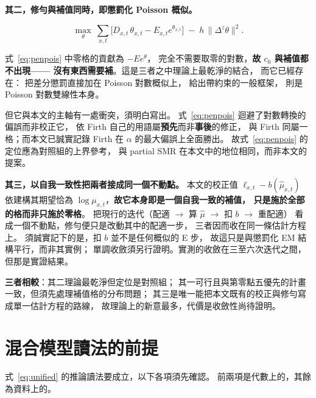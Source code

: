 \documentclass[UTF8, fontset=macnew, a4paper, 12pt]{ctexart}
\begin{document}
\textbf{其二，修勻與補值同時，即懲罰化 Poisson 概似。}

\begin{equation}\label{eq:penpois}
\max_{\theta}\ \sum_{x,t}\big[D_{x,t}\,\theta_{x,t}-E_{x,t}e^{\theta_{x,t}}\big]
\;-\;h\,\|\Delta^{z}\theta\|^2 .
\end{equation}

式~\eqref{eq:penpois} 中零格的貢獻為 $-E e^{\theta}$，
完全不需要取零的對數，\textbf{故 $c_0$ 與補值都不出現——
沒有東西需要補}。這是三者之中理論上最乾淨的結合，
而它已經存在：\citet{delwarde2007} 把差分懲罰直接加在 Poisson 對數概似上，
\citet{currie2013} 給出帶約束的一般框架，\citet{brouhns2002} 則是
Poisson 對數雙線性本身。

但它與本文的主軸有一處衝突，須明白寫出。
式~\eqref{eq:penpois} 迴避了對數轉換的偏誤而非校正它，
依 Firth 自己的用語屬\textbf{預先}而非\textbf{事後}的修正，
與 Firth 同屬一格；而本文已誠實記錄 Firth 在 $\alpha$ 的最大偏誤上全面勝出。
故式~\eqref{eq:penpois} 的定位應為對照組的上界參考，
與 partial SMR 在本文中的地位相同，而非本文的提案。

\textbf{其三，以自我一致性把兩者接成同一個不動點。}
本文的校正值 $\ell_{x,t}-b(\hat\mu_{x,t})$ 依建構其期望恰為
$\log\mu_{x,t}$，\textbf{故它本身即是一個自我一致的補值，
只是施於全部的格而非只施於零格}。
把現行的迭代（配適 $\to$ 算 $\hat\mu$ $\to$ 扣 $b$ $\to$ 重配適）
看成一個不動點，修勻便只是改動其中的配適一步，
三者因而收在同一條估計方程上。
須誠實記下的是，扣 $b$ 並不是任何概似的 E 步，
故這只是與懲罰化 EM \citep{dempster1977} 結構平行，而非其實例；
單調收斂須另行證明。實測的收斂在三至六次迭代之間，
但那是實證結果。

\textbf{三者相較}：其二理論最乾淨但定位是對照組；
其一可行且與第零點五優先的計畫一致，但須先處理補值格的分布問題；
其三是唯一能把本文既有的校正與修勻寫成單一估計方程的路線，
故理論上的新意最多，代價是收斂性尚待證明。

\section{混合模型讀法的前提}\label{sec:premise}

式~\eqref{eq:unified} 的推論讀法要成立，以下各項須先確認。
前兩項是代數上的，其餘為資料上的。
\end{document}
